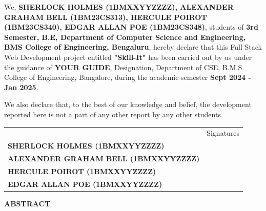     \begin{spacing}{1.25}
        
        \noindent
        \large We, \textbf{SHERLOCK HOLMES (1BMXXYYZZZZ), ALEXANDER GRAHAM BELL (1BM23CS313), HERCULE POIROT (1BM23CS340), EDGAR ALLAN POE (1BM23CS348)}, students of \textbf{3rd Semester, B.E, Department of Computer Science and Engineering, BMS College of Engineering, Bengaluru}, hereby declare that this Full Stack Web Development project entitled \textbf{"Skill-It"} has been carried out by us under the guidance of \textbf{YOUR GUIDE}, Designation, Department of CSE, B.M.S College of Engineering, Bangalore, during the academic semester \textbf{Sept 2024 - Jan 2025}.

        \noindent
        \Large We also declare that, to the best of our knowledge and belief, the development reported here is not a part of any other report by any other students.
        
        \vspace{1cm}
        \setlength\tabcolsep{0pt}
        \noindent
        \begingroup
        \fontsize{14pt}{12pt}
        \begin{tabulary}{0.95\linewidth}{LR}
            & Signatures \\
            \textbf{SHERLOCK HOLMES (1BMXXYYZZZZ)} & \\
            \textbf{ALEXANDER GRAHAM BELL (1BMXXYYZZZZ)} & \\
            \textbf{HERCULE POIROT (1BMXXYYZZZZ)} & \\
            \textbf{EDGAR ALLAN POE (1BMXXYYZZZZ)} & \\
        \end{tabulary}
        \endgroup
    \end{spacing}
\clearpage
    \begin{center}
    \Large \textbf{ABSTRACT}
    \end{center}
    \begin{spacing}{2.0}
        \lipsum[0-5]
    \end{spacing}

